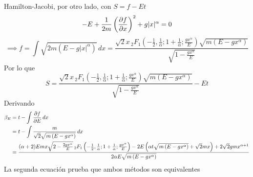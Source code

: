 \documentclass[]{article}
\numberwithin{equation}{section}
\begin{document}
Hamilton-Jacobi, por otro lado, con $S = f - E t$
\begin{equation}
	- E +  \frac{1}{2 m} \left(\dfrac{\partial f}{\partial x}\right)^2 + g |x|^\alpha = 0
\end{equation}
\begin{equation}
	\implies f = \int \sqrt{2 m (E -  g |x|^\alpha)} \, dx = \frac{\sqrt{2} x \, _2F_1\left(-\frac{1}{2},\frac{1}{\alpha };1+\frac{1}{\alpha };\frac{g x^{\alpha }}{E}\right) \sqrt{m \left(E-g x^{\alpha }\right)}}{\sqrt{1-\frac{g x^{\alpha }}{E}}}
\end{equation}
Por lo que
\begin{equation}
	S = \frac{\sqrt{2} x \, _2F_1\left(-\frac{1}{2},\frac{1}{\alpha };1+\frac{1}{\alpha };\frac{g x^{\alpha }}{E}\right) \sqrt{m \left(E-g x^{\alpha }\right)}}{\sqrt{1-\frac{g x^{\alpha }}{E}}} - E t
\end{equation}
Derivando
\begin{align}
	\beta_E &= t - \int \dfrac{\partial f}{\partial E} \, dx\\
	&= t - \int \frac{m}{\sqrt{2} \sqrt{m \left(E -g x^{\alpha }\right)}} \, dx\\
	&= \frac{(\alpha +2) E m x \sqrt{2-\frac{2 g x^{\alpha }}{E}} \, _2F_1\left(-\frac{1}{2},\frac{1}{\alpha };1+\frac{1}{\alpha };\frac{g x^{\alpha }}{E}\right)-2 E \left(\alpha  t \sqrt{m \left(E-g x^{\alpha }\right)}+\sqrt{2} m x\right)+2 \sqrt{2} g m x^{\alpha +1}}{2 \alpha  E \sqrt{m \left(E-g x^{\alpha }\right)}}
\end{align}
La segunda ecuación prueba que ambos métodos son equivalentes
\end{document}
